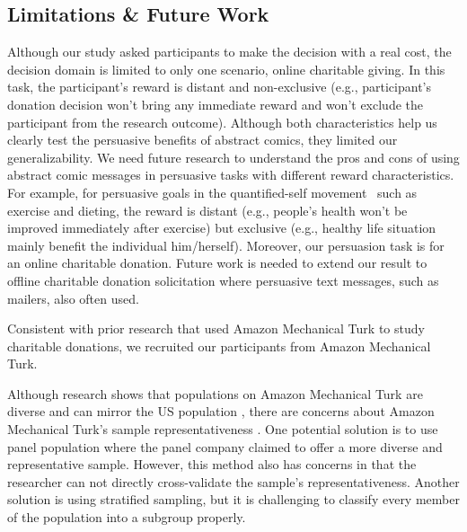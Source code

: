 \subsection{Limitations \& Future Work}
\begin{description}[leftmargin=\parindent,topsep=0pt,partopsep=3pt,parsep=0pt,itemsep=3pt, listparindent=\parindent]
\item[Distant and Non-exclusive Task:]  Although our study asked participants to make the decision with a real cost, the decision domain is limited to only one scenario, online charitable giving. In this task, the participant's reward is distant and non-exclusive (e.g., participant's donation decision won't bring any immediate reward and won't exclude the participant from the research outcome). Although both characteristics help us clearly test the persuasive benefits of abstract comics, they limited our generalizability. We need future research to understand the pros and cons of using abstract comic messages in persuasive tasks with different reward characteristics. For example, for persuasive goals in the quantified-self movement~\cite{Epstein2014,Choe2014} such as exercise and dieting, the reward is distant (e.g., people's health won't be improved immediately after exercise) but exclusive (e.g., healthy life situation mainly benefit the individual him/herself). Moreover, our persuasion task is for an online charitable donation. Future work is needed to extend our result to offline charitable donation solicitation where persuasive text messages, such as mailers, also often used. 

\item[Study on Amazon Mechanical Turk:] Consistent with prior research \cite{lee2013does,saunders2016no,sussman2015framing,arechar2017turking,branas2018gender} that used Amazon Mechanical Turk to study charitable donations, we recruited our participants from Amazon Mechanical Turk.


Although research shows that populations on Amazon Mechanical Turk are diverse and can mirror the US population \cite{buhrmester2011amazon,behrend2011viability,berinsky2012evaluating}, there are concerns about Amazon Mechanical Turk's sample representativeness \cite{landers2015inconvenient,paolacci2010running}. One potential solution is to use panel population where the panel company claimed to offer a more diverse and representative sample.
However, this method also has concerns in that the researcher can not directly cross-validate the sample's representativeness. Another solution is using stratified sampling, but it is challenging to classify every member of the population into a subgroup properly. 


\end{description}
